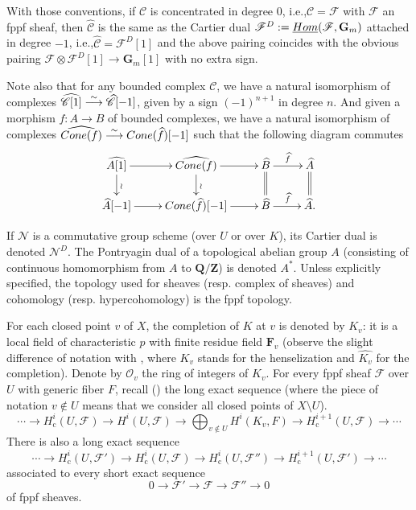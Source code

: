 \documentclass[10pt,a4paper]{amsart}
\newcommand{\ie}{i.e.,\xspace}
\newcommand{\resp}{resp.\xspace}
\let\mathcal\mathscr
\newcommand\To[1]{\mathchoice{\xrightarrow{\textstyle\kern4pt#1\kern3pt}}{\stackrel{#1}{\longrightarrow}}{}{}}
\newcommand{\rc}{\mathrm{c}}
\theoremstyle{plain}
\theoremstyle{definition}
\newcommand \ZZ {\mathbf{Z}}
\newcommand \QQ {\mathbf{Q}}
\newcommand \FF {\mathbf{F}}
\newcommand \Gm {\mathbf{G}_m}\let\G\Gm
\newcommand\cF {\mathcal{F}}
\newcommand\cN {\mathcal{N}}
\newcommand\cO {\mathcal{O}}
\newcommand \cC {\mathcal{C}}
\begin{document}
With those conventions, if $\cC$ is concentrated in degree $0$, \ie $\cC = \cF$ with $\cF$ an fppf sheaf, then $\widehat{\cC}$ is the same as the Cartier dual $\cF^D:= \underline{\textup{Hom}}(\cF, \Gm)$ attached in degree $-1$, \ie $\widehat{\cC} = \cF^D[1]$ and the above pairing coincides with the obvious pairing $\cF \otimes \cF^D[1] \to \Gm[1]$ with no extra sign.

Note also that for any bounded complex $\cC$, we have a natural isomorphism of complexes $\widehat{\cC[1]} \To{\sim} \widehat{\cC}[-1]$, given by a sign $(-1)^{n+1}$ in degree $n$. And given a morphism $f: A \to B$ of bounded complexes, we have a natural isomorphism of complexes $\widehat{\textup{Cone}(f)} \To{\sim} \textup{Cone}(\widehat{f})[-1]$ such that the following diagram commutes\vspace*{-3pt}
\begin{equation} \label{cone and dual}
\begin{array}{c}
\xymatrix@R=6mm{
\widehat{A[1]} \ar[r] \ar[d]^\wr & \widehat{\textup{Cone}(f)} \ar[r] \ar[d]^\wr & \widehat{B} \ar[r]^{\widehat{f}} \ar@{=}[d] & \widehat{A} \ar@{=}[d] \\
\widehat{A}[-1] \ar[r] & \textup{Cone}(\widehat{f})[-1] \ar[r] & \widehat{B} \ar[r]^{\widehat{f}} & \widehat{A}.
}
\end{array}
\end{equation}

If $\cN$ is a commutative
group scheme (over $U$ or over $K$), its Cartier dual is
denoted $\cN^D$. The Pontryagin dual of a topological abelian group
$A$ (consisting of continuous homomorphism from $A$ to $\QQ/\ZZ$) is
denoted $A^*$. Unless explicitly specified, the topology used for
sheaves (\resp complex of sheaves) and cohomology (\resp hypercohomology) is the fppf topology.

For each closed point $v$ of $X$, the completion of $K$ at $v$
is denoted by $K_v$: it is a local field of characteristic $p$ with
finite residue field $\FF_v$ (observe the slight difference of notation with
\cite{DemH}, where $K_v$ stands for the henselization and $\widehat{K_v}$
for the completion). Denote by $\cO_v$ the ring of integers of $K_v$.
For every fppf sheaf $\cF$
over $U$ with generic fiber $F$, recall (\cite[Prop.\,2.1]{DemH})
the long exact sequence (where the piece of notation $v \not \in U$ means
that we consider all closed points of $X\setminus U$).
\begin{equation} \label{suppcomp}
\cdots\to H^i_\rc(U,\cF) \to H^i(U,\cF) \to \bigoplus_{v \not
\in U} H^i(K_v,F) \to H^{i+1}_\rc(U,\cF) \to\cdots
\end{equation}
There is also a long exact sequence
\begin{equation} \label{longex1}
\cdots\to H^i_\rc(U,\cF') \to H^i_\rc(U,\cF) \to
H^i_\rc(U,\cF'') \to H^{i+1}_\rc(U,\cF ') \to\cdots
\end{equation}
associated to every short exact sequence
\[
0 \to \cF' \to \cF \to \cF'' \to 0
\]
of fppf sheaves.
\end{document}
